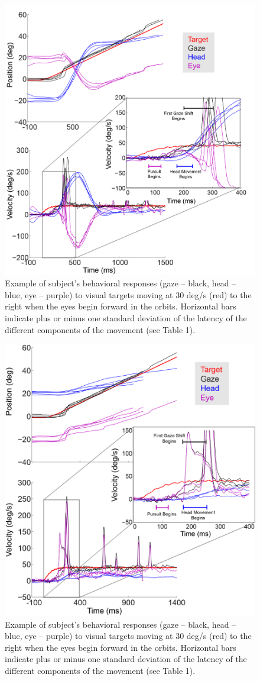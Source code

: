 \documentclass[12pt]{article}
\begin{document}
\begin{figure}[h]
\centering
\includegraphics[width=0.7\linewidth]{./figs/ForwardIEP}
\caption[Behavior during Forward IEP]{Example of subject’s behavioral responses (gaze – black, head – blue, eye – purple) to visual targets moving at 30 deg/s (red) to the right when the eyes begin forward in the orbits. Horizontal bars indicate plus or minus one standard deviation of the latency of the different components of the movement (see Table 1).
}
\label{fig:ForwardIEP}
\end{figure}

\begin{figure}[h]
\centering
\includegraphics[width=0.7\linewidth]{./figs/BackwardIEP}
\caption[Behavior with forward IEP]{Example of subject’s behavioral responses (gaze – black, head – blue, eye – purple) to visual targets moving at 30 deg/s (red) to the right when the eyes begin forward in the orbits. Horizontal bars indicate plus or minus one standard deviation of the latency of the different components of the movement (see Table 1).}
\label{fig:BackwardIEP}
\end{figure}
\end{document}
